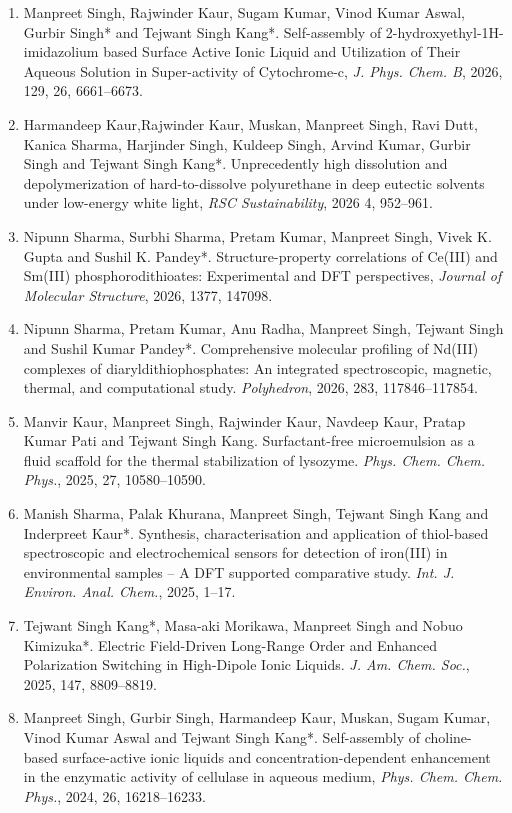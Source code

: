 \documentclass[11pt,a4paper]{article}
\begin{document}
\begin{enumerate}[leftmargin=*,label=\arabic*.,itemsep=5pt]
\item Manpreet Singh, Rajwinder Kaur, Sugam Kumar, Vinod Kumar Aswal, Gurbir Singh* and Tejwant Singh Kang*. Self-assembly of 2-hydroxyethyl-1H-imidazolium based Surface Active Ionic Liquid and Utilization of Their Aqueous Solution in Super-activity of Cytochrome-c, \textit{J. Phys. Chem. B}, 2026, 129, 26, 6661--6673.
\item Harmandeep Kaur,Rajwinder Kaur, Muskan, Manpreet Singh, Ravi Dutt, Kanica Sharma, Harjinder Singh, Kuldeep Singh, Arvind Kumar, Gurbir Singh and Tejwant Singh Kang*. Unprecedently high dissolution and depolymerization of hard-to-dissolve polyurethane in deep eutectic solvents under low-energy white light, \textit{RSC Sustainability}, 2026 4, 952--961.
\item Nipunn Sharma, Surbhi Sharma, Pretam Kumar, Manpreet Singh, Vivek K. Gupta and Sushil K. Pandey*. Structure-property correlations of Ce(III) and Sm(III) phosphorodithioates: Experimental and DFT perspectives, \textit{Journal of Molecular Structure}, 2026, 1377, 147098.
\item Nipunn Sharma, Pretam Kumar, Anu Radha, Manpreet Singh, Tejwant Singh and Sushil Kumar Pandey*. Comprehensive molecular profiling of Nd(III) complexes of diaryldithiophosphates: An integrated spectroscopic, magnetic, thermal, and computational study. \textit{Polyhedron}, 2026, 283, 117846--117854.
\item Manvir Kaur, Manpreet Singh, Rajwinder Kaur, Navdeep Kaur, Pratap Kumar Pati and Tejwant Singh Kang. Surfactant-free microemulsion as a fluid scaffold for the thermal stabilization of lysozyme. \textit{Phys. Chem. Chem. Phys.}, 2025, 27, 10580--10590.
\item Manish Sharma, Palak Khurana, Manpreet Singh, Tejwant Singh Kang and Inderpreet Kaur*. Synthesis, characterisation and application of thiol-based spectroscopic and electrochemical sensors for detection of iron(III) in environmental samples -- A DFT supported comparative study. \textit{Int. J. Environ. Anal. Chem.}, 2025, 1--17.
\item Tejwant Singh Kang*, Masa-aki Morikawa, Manpreet Singh and Nobuo Kimizuka*. Electric Field-Driven Long-Range Order and Enhanced Polarization Switching in High-Dipole Ionic Liquids. \textit{J. Am. Chem. Soc.}, 2025, 147, 8809--8819.
\item Manpreet Singh, Gurbir Singh, Harmandeep Kaur, Muskan, Sugam Kumar, Vinod Kumar Aswal and Tejwant Singh Kang*. Self-assembly of choline-based surface-active ionic liquids and concentration-dependent enhancement in the enzymatic activity of cellulase in aqueous medium, \textit{Phys. Chem. Chem. Phys.}, 2024, 26, 16218--16233.

\end{enumerate}
\end{document}

